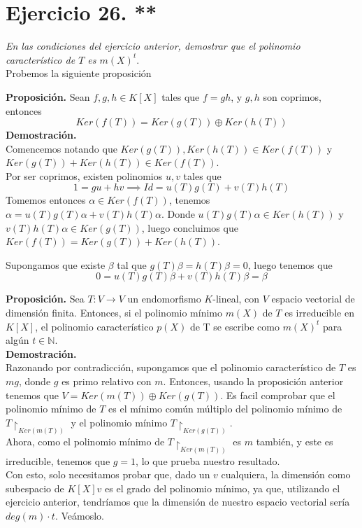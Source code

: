 \section{Ejercicio 26. **} \textit{En las condiciones del ejercicio anterior,
  demostrar que el polinomio característico de \(T\) es \(m(X)^t\)}.\\

Probemos la siguiente proposición

\textbf{Proposición. }Sean \(f,g,h \in K[X]\) tales que \(f = gh\), y \(g,h\) son
coprimos, entonces
\[
  Ker(f(T)) = Ker(g(T)) \oplus Ker(h(T))
\]
\textbf{Demostración.}\\
Comencemos notando que \(Ker(g(T)), Ker(h(T)) \in Ker(f(T))\) y \(Ker(g(T)) +
Ker(h(T)) \in Ker(f(T))\).\\ Por ser coprimos, existen polinomios \(u,v\) tales
que
\[
  1 = gu + hv \implies Id = u(T)g(T) + v(T)h(T)
\]
Tomemos entonces \(\alpha \in Ker(f(T))\), tenemos \(\alpha = u(T)g(T)\alpha +
v(T)h(T)\alpha\).
Donde  \( u(T)g(T)\alpha \in Ker(h(T))\) y  \( v(T)h(T)\alpha \in Ker(g(T))\),
luego concluimos que \(Ker(f(T)) = Ker(g(T)) + Ker(h(T))\).

Supongamos que existe \(\beta\) tal que \(g(T)\beta = h(T)\beta = 0\), luego
tenemos que
\[
  0 = u(T)g(T)\beta + v(T)h(T)\beta = \beta
\]

\textbf{Proposición.} Sea \(T: V \rightarrow V \) un endomorfismo \(K\)-lineal, con \(V\) espacio vectorial de dimensión finita. Entonces, si el polinomio mínimo \(m(X)\) de  \(T\) es irreducible en  \(K[X]\), el polinomio característico \(p(X)\) de T se escribe como \(m(X)^t\) para algún \(t \in \mathbb{N}\).\\

\textbf{Demostración.}\\
Razonando por contradicción, supongamos que el polinomio característico de \(T\) es  \(mg\), donde  \(g\) es primo relativo con \(m\). Entonces, usando la proposición anterior tenemos que \(V = Ker(m(T)) \oplus Ker(g(T))\). Es facil comprobar que el polinomio mínimo de \(T\) es el mínimo común múltiplo del polinomio mínimo de \(T\restriction_{Ker(m(T))}\) y el polinomio mínimo \(T\restriction_{Ker(g(T))}\).\\

Ahora, como el polinomio mínimo de \(T\restriction_{Ker(m(T))}\) es \(m\) también, y este es irreducible, tenemos que \(g = 1\), lo que prueba nuestro resultado.\\

Con esto, solo necesitamos probar que, dado un \(v\) cualquiera, la dimensión como subespacio de \(K[X]v\) es el grado del polinomio mínimo, ya que, utilizando el ejercicio anterior, tendríamos que la dimensión de nuestro espacio vectorial sería \(deg(m) \cdot t\). Veámoslo.

